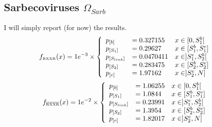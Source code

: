 \documentclass[pdflatex,sn-basic,iicol]{sn-jnl}%
\begin{document}
\subsection{Sarbecoviruses $\Omega_{Sarb}$}
I will simply report (for now) the results.
\[
    f_{\scriptscriptstyle{\text{RXXR}}}(x) = 1e^{-3} \times \left \{  
        \begin{array}{l l l}
            p_{[b]}         & = 0.327155    & x \in [0, S_1^{b}[        \\
            p_{[S_1]}       & = 0.29627     & x \in [S_1^{b}, S_1^{e}]  \\
            p_{[S_{link}]}  & = 0.0470411   & x \in ]S_1^{e}, S_2^{b}[  \\
            p_{[S_2]}       & = 0.283475    & x \in [S_2^{b}, S_2^{e}]   \\
            p_{[e]}         & = 1.97162     & x \in ]S_2^{e}, N]
        \end{array}   \right . 
\]
\[
    f_{\scriptscriptstyle{\overline{\text{RXXR}}}}(x) = 1e^{-2} \times \left \{  
        \begin{array}{l l l}
            p_{[b]}         & = 1.06255     & x \in [0, S_1^{b}[        \\
            p_{[S_1]}       & = 1.0844      & x \in [S_1^{b}, S_1^{e}]  \\
            p_{[S_{link}]}  & = 0.23991     & x \in ]S_1^{e}, S_2^{b}[  \\
            p_{[S_2]}       & = 1.3954      & x \in [S_2^{b}, S_2^{e}]   \\
            p_{[e]}         & = 1.82017     & x \in ]S_2^{e}, N]
        \end{array}   \right . 
\]



\end{document}
